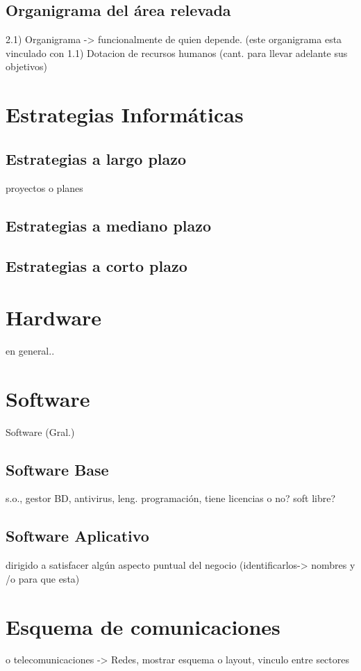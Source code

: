 \documentclass[10pt,a4paper,final]{article}
\begin{document}
\subsection{Organigrama del área relevada}
    2.1) Organigrama -> funcionalmente de quien depende. (este organigrama esta vinculado con 1.1)
          Dotacion de recursos humanos (cant. para llevar adelante sus objetivos)
\section{Estrategias Informáticas}
\subsection{Estrategias a largo plazo}
proyectos o planes
\subsection{Estrategias a mediano plazo}
\subsection{Estrategias a corto plazo}

\section{Hardware}
en general..
\section{Software}
Software (Gral.)
\subsection{Software Base}
s.o., gestor BD, antivirus, leng. programación, tiene licencias o no? soft libre?
\subsection{Software Aplicativo}
dirigido a satisfacer algún aspecto puntual del negocio (identificarlos-> nombres y /o para que esta)
\section{Esquema de comunicaciones}
 o telecomunicaciones -> Redes, mostrar esquema o layout, vinculo entre sectores
\end{document}
